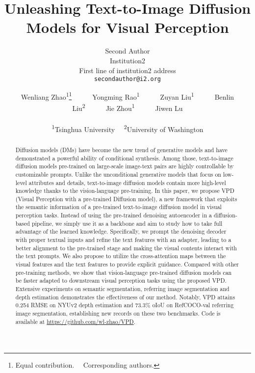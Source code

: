 \documentclass[10pt,twocolumn,letterpaper]{article}
\begin{document}
\title{Unleashing Text-to-Image Diffusion Models for Visual Perception}

\author{
\and
Second Author\\
Institution2\\
First line of institution2 address\\
{\tt\small secondauthor@i2.org}
}



\def\spaces{~~~~~~}
\author{Wenliang Zhao\textsuperscript{1}\thanks{Equal contribution. ~~\textsuperscript{\dag}Corresponding authors.}\spaces{}Yongming Rao\textsuperscript{1}\footnotemark[1]\spaces{}Zuyan Liu\textsuperscript{1}\footnotemark[1]\spaces{}Benlin Liu\textsuperscript{2}\spaces{}Jie Zhou\textsuperscript{1}\spaces{}Jiwen Lu\\\\
\textsuperscript{1}Tsinghua University~~
\textsuperscript{2}University of Washington}

\maketitle
\ificcvfinal\thispagestyle{empty}\fi


\begin{abstract}
Diffusion models (DMs) have become the new trend of generative models and have demonstrated a powerful ability of conditional synthesis. Among those, text-to-image diffusion models pre-trained on large-scale image-text pairs are highly controllable by customizable prompts. Unlike the unconditional generative models that focus on low-level attributes and details, text-to-image diffusion models contain more high-level knowledge thanks to the vision-language pre-training. In this paper, we propose VPD (Visual Perception with a pre-trained Diffusion model), a new framework that exploits the semantic information of a pre-trained text-to-image diffusion model in visual perception tasks. Instead of using the pre-trained denoising autoencoder in a diffusion-based pipeline, we simply use it as a backbone and aim to study how to take full advantage of the learned knowledge. Specifically, we prompt the denoising decoder with proper textual inputs and refine the text features with an adapter, leading to a better alignment to the pre-trained stage and making the visual contents interact with the text prompts. We also propose to utilize the cross-attention maps between the visual features and the text features to provide explicit guidance. Compared with other pre-training methods, we show that vision-language pre-trained diffusion models can be faster adapted to downstream visual perception tasks using the proposed VPD. Extensive experiments on semantic segmentation, referring image segmentation and depth estimation demonstrates the effectiveness of our method. Notably, VPD attains 0.254 RMSE on NYUv2 depth estimation  and 73.3\% oIoU on RefCOCO-val referring image segmentation, establishing new records on these two benchmarks. Code is available at \url{https://github.com/wl-zhao/VPD}.

\end{abstract}
\end{document}
